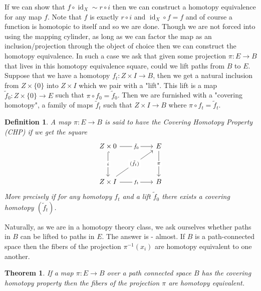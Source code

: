 \documentclass[40pt]{article}
\newtheorem{definition}{Definition}[section]
\newtheorem{theorem}{Theorem}[section]
\DeclareMathOperator{\id}{\text{id}}
\begin{document}
	If we can show that $f \circ \id_X \sim r \circ i$ then we can construct a homotopy equivalence for any map $f$. Note that $f$ is exactly $r \circ i$ and $\id_X \circ f = f$ and of course a function is homotopic to itself and so we are done. Though we are not forced into using the mapping cylinder, as long as we can factor the map as an inclusion/projection through the object of choice then we can construct the homotopy equivalence. In such a case we ask that given some projection $\pi : E \rightarrow B$ that lives in this homotopy equivalence square, could we lift paths from $B$ to $E$. Suppose that we have a homotopy $f_t : Z \times I \rightarrow B$, then we get a natural inclusion from $Z \times \{0\}$ into $Z \times I$ which we pair with a "lift". This lift is a map $\tilde f_0  : Z \times \{0\} \rightarrow E$ such that $\pi \circ f_0 = \tilde f_0$. Then we are furnished with a "covering homotopy", a family of maps $\tilde f_t$ such that $Z \times I \rightarrow B$ where $\pi \circ f_t = \tilde f_t$. 
	\begin{definition}
		A map $\pi : E \rightarrow B$ is said to have the Covering Homotopy Property (CHP) if we get the square
		\[\begin{tikzcd}
			{Z \times 0} && E \\
			\\
			{Z \times I} && B
			\arrow["{\tilde f_0}"{description}, from=1-1, to=1-3]
			\arrow["i"{description}, hook, from=1-1, to=3-1]
			\arrow["\pi"{description}, from=1-3, to=3-3]
			\arrow["{(\tilde f_t)}"{description}, from=3-1, to=1-3]
			\arrow["{f_t}"{description}, from=3-1, to=3-3]
		\end{tikzcd}\]
		More precisely if for any homotopy $f_t$ and a lift $\tilde f_0$ there exists a covering homotopy $(\tilde f_t)$. 
	\end{definition}
	Naturally, as we are in a homotopy theory class, we ask ourselves whether paths in $B$ can be lifted to paths in $E$. The answer is - almost. If $B$ is a path-connected space then the fibers of the projection $\pi^{-1}(x_i)$ are homotopy equivalent to one another. 
	\begin{theorem}
		If a map $\pi : E \rightarrow B$ over a path connected space $B$ has the covering homotopy property then the fibers of the projection $\pi$ are homotopy equivalent. 
	\end{theorem}
\end{document}
